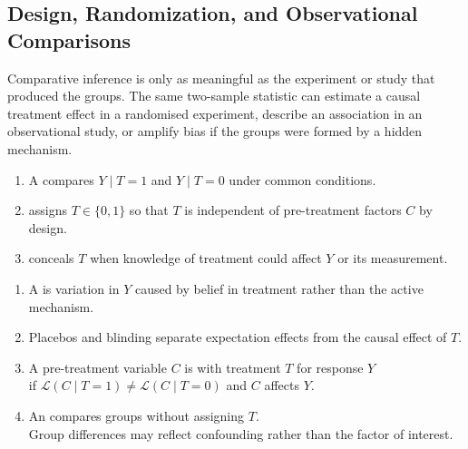 \subsection{Design, Randomization, and Observational Comparisons}

Comparative inference is only as meaningful as the experiment or study that produced the groups.  The same two-sample statistic can estimate a causal treatment effect in a randomised experiment, describe an association in an observational study, or amplify bias if the groups were formed by a hidden mechanism.

\begin{definition} \label{def:controls-randomization-and-blinding} 
\begin{enumerate}[label=(\roman*)]
\setlength{\itemsep}{0pt}
\item A  compares $Y\mid T=1$ and $Y\mid T=0$ under common conditions.
\item {} assigns $T\in\{0,1\}$ so that $T$ is independent of pre-treatment factors $C$ by design.
\item {} conceals $T$ when knowledge of treatment could affect $Y$ or its measurement.
\end{enumerate}
\end{definition}

\begin{definition} \label{def:placebo-effect-and-confounding} 
\begin{enumerate}[label=(\roman*)]
\setlength{\itemsep}{0pt}
\item A  is variation in $Y$ caused by belief in treatment rather than the active mechanism.
\item Placebos and blinding separate expectation effects from the causal effect of $T$.
\item A pre-treatment variable $C$ is  with treatment $T$ for response $Y$\\
if $\mathcal{L}(C\mid T=1)\neq\mathcal{L}(C\mid T=0)$ and $C$ affects $Y$.
\item An  compares groups without assigning $T$.\\
Group differences may reflect confounding rather than the factor of interest.
\end{enumerate}
\end{definition}

